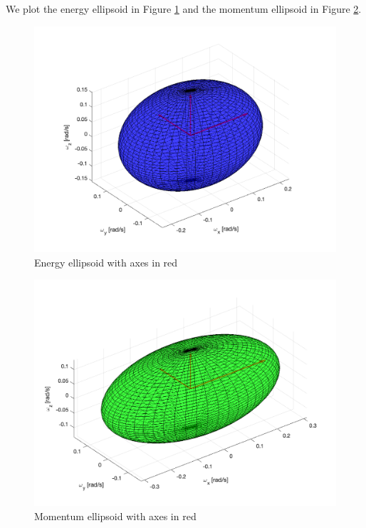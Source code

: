 We plot the energy ellipsoid in Figure \ref{fig:ps2_problem6_energy} and the momentum ellipsoid in Figure \ref{fig:ps2_problem6_momentum}.

\begin{figure}[H]
\centering
\includegraphics[scale=0.5]{Images/ps2_problem6_energy.png}
\caption{Energy ellipsoid with axes in red}
\label{fig:ps2_problem6_energy}
\end{figure}

\begin{figure}[H]
\centering
\includegraphics[scale=0.5]{Images/ps2_problem6_momentum.png}
\caption{Momentum ellipsoid with axes in red}
\label{fig:ps2_problem6_momentum}
\end{figure}

